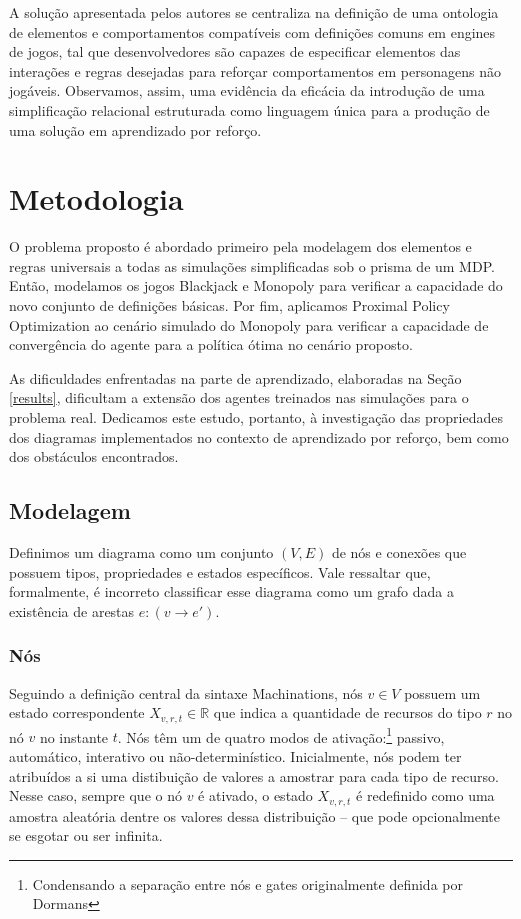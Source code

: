 \documentclass[conference]{IEEEtran}
\begin{document}
A solução apresentada pelos autores se centraliza na definição de uma ontologia de elementos e comportamentos compatíveis com definições comuns em engines de jogos, tal que desenvolvedores são capazes de especificar elementos das interações e regras desejadas para reforçar comportamentos em personagens não jogáveis. Observamos, assim, uma evidência da eficácia da introdução de uma simplificação relacional estruturada como linguagem única para a produção de uma solução em aprendizado por reforço.

\section{Metodologia}

O problema proposto é abordado primeiro pela modelagem dos elementos e regras universais a todas as simulações simplificadas sob o prisma de um MDP. Então, modelamos os jogos Blackjack e Monopoly para verificar a capacidade do novo conjunto de definições básicas. Por fim, aplicamos Proximal Policy Optimization ao cenário simulado do Monopoly para verificar a capacidade de convergência do agente para a política ótima no cenário proposto.

As dificuldades enfrentadas na parte de aprendizado, elaboradas na Seção \ref{results}, dificultam a extensão dos agentes treinados nas simulações para o problema real. Dedicamos este estudo, portanto, à investigação das propriedades dos diagramas implementados no contexto de aprendizado por reforço, bem como dos obstáculos encontrados.

\subsection{Modelagem}
\label{modeling}
Definimos um diagrama como um conjunto $(V, E)$ de nós e conexões que possuem tipos, propriedades e estados específicos. Vale ressaltar que, formalmente, é incorreto classificar esse diagrama como um grafo dada a existência de arestas $e:(v\rightarrow e')$.

\subsubsection{Nós}
Seguindo a definição central da sintaxe Machinations, nós $v \in V$ possuem um estado correspondente $X_{v,r,t} \in \mathbb{R}$ que indica a quantidade de recursos do tipo $r$ no nó $v$ no instante $t$. Nós têm um de quatro modos de ativação:\footnote{Condensando a separação entre nós e gates originalmente definida por Dormans} passivo, automático, interativo ou não-determinístico. Inicialmente, nós podem ter atribuídos a si uma distibuição de valores a amostrar para cada tipo de recurso. Nesse caso, sempre que o nó $v$ é ativado, o estado $X_{v,r,t}$ é redefinido como uma amostra aleatória dentre os valores dessa distribuição -- que pode opcionalmente se esgotar ou ser infinita.
\end{document}
